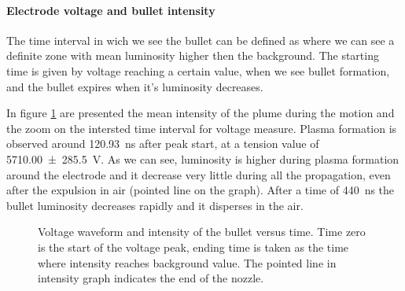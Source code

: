\paragraph{Electrode voltage and bullet intensity}
The time interval in wich we see the bullet can be defined as where we can see a definite zone with mean luminosity higher then the background. The starting time is given by voltage reaching a certain value, when we see bullet formation, and the bullet expires when it's luminosity decreases.

In figure \ref{fig:elio_d035_I} are presented the mean intensity of the plume during the motion and the zoom on the intersted time interval for voltage measure. Plasma formation is observed around \SI{120.93}{\nano\second} after peak start, at a tension value of \SI{5710.00(28550)}{\volt}. %
As we can see, luminosity is higher during plasma formation around the electrode and it decrease very little during all the propagation, even after the expulsion in air (pointed line on the graph). After a time of \SI{440}{\nano\second} the bullet luminosity decreases rapidly and it disperses in the air.
\begin{figure}
 \centering
 \hfill
 \caption{Voltage waveform and intensity of the bullet versus time. Time zero is the start of the voltage peak, ending time is taken as the time where intensity reaches background value. The pointed line in intensity graph indicates the end of the nozzle.}
 \label{fig:elio_d035_I}
\end{figure}

